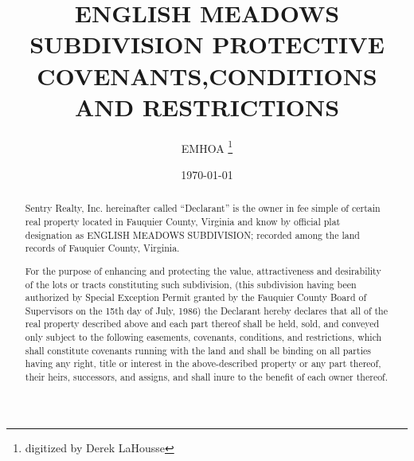 \documentclass[10pt, letterpaper]{article}
\title{ENGLISH MEADOWS SUBDIVISION PROTECTIVE COVENANTS,\linebreak[0] CONDITIONS AND RESTRICTIONS}
\author{EMHOA \thanks{digitized by Derek LaHousse}}
\date{\today}
\begin{document}

\begin{abstract}
  Sentry Realty, Inc. hereinafter called ``Declarant'' is the owner in fee simple of certain real property located in Fauquier County, Virginia and know by official plat designation as ENGLISH MEADOWS SUBDIVISION; recorded among the land records of Fauquier County, Virginia.

  For the purpose of enhancing and protecting the value, attractiveness and desirability of the lots or tracts constituting such subdivision, (this subdivision having been authorized by Special Exception Permit granted by the Fauquier County Board of Supervisors on the 15th day of July, 1986) the Declarant hereby declares that all of the real property described above and each part thereof shall be held, sold, and conveyed only subject to the following easements, covenants, conditions, and restrictions, which shall constitute covenants running with the land and shall be binding on all parties having any right, title or interest in the above-described property or any part thereof, their heirs, successors, and assigns, and shall inure to the benefit of each owner thereof.
\end{abstract}
\end{document}

